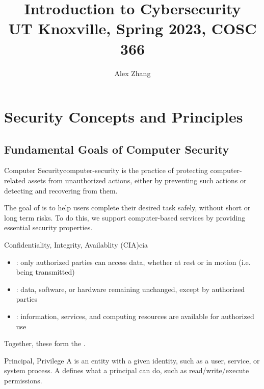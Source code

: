 \documentclass[12pt]{report}
\title{\textbf{Introduction to Cybersecurity}\\
\large UT Knoxville, Spring 2023, COSC 366}
\author{Alex Zhang}
\begin{document}
\maketitle
\tableofcontents

\chapter{Security Concepts and Principles}

\section{Fundamental Goals of Computer Security}

\begin{dfnbox}{Computer Security}{computer-security}
     is the practice of protecting computer-related assets from unauthorized actions, either by preventing such actions or detecting and recovering from them.
\end{dfnbox}

The goal of  is to help users complete their desired task safely, without short or long term risks.  To do this, we support computer-based services by providing essential security properties.

\begin{dfnbox}{Confidentiality, Integrity, Availablity (CIA)}{cia}
    \begin{itemize}[noitemsep]
        \item {}: only authorized parties can access data, whether at rest or in motion (i.e. being transmitted)
        \item {}: data, software, or hardware remaining unchanged, except by authorized parties
        \item {}: information, services, and computing resources are available for authorized use
    \end{itemize}
    Together, these form the .
\end{dfnbox}

\begin{dfnbox}{Principal, Privilege}{}
    A  is an entity with a given identity, such as a user, service, or system process. A  defines what a principal can do, such as read/write/execute permissions.
\end{dfnbox}
\end{document}
